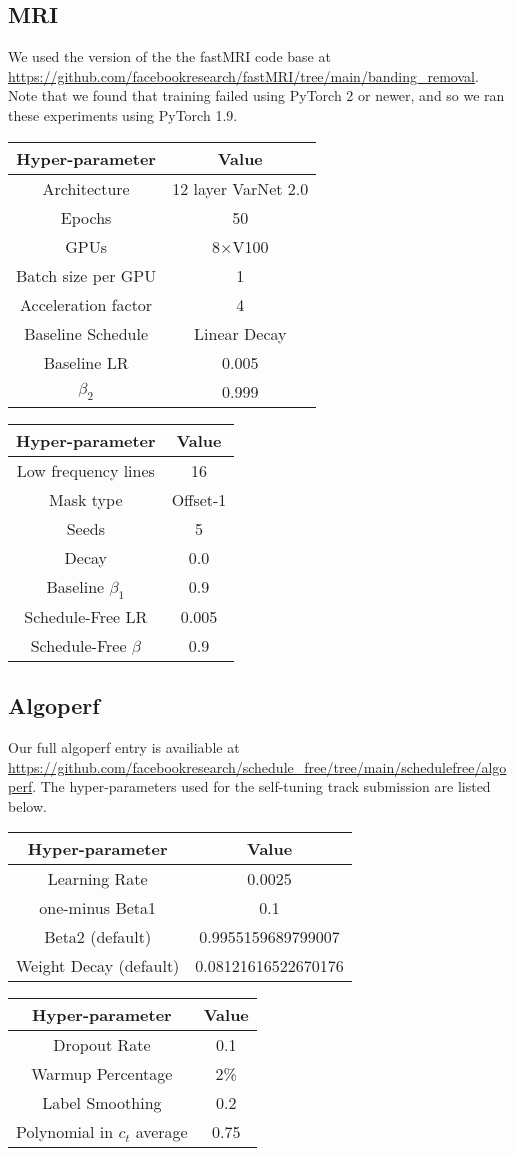 \documentclass{article}
\begin{document}
\subsection{MRI}
We used the version of the the fastMRI code base at \url{https://github.com/facebookresearch/fastMRI/tree/main/banding_removal}. Note that we found that training failed using PyTorch 2 or newer, and so we ran these experiments using PyTorch 1.9.

\begin{tabular}[t]{|c|c|}
\hline 
\textbf{Hyper-parameter}  & \textbf{Value}\tabularnewline
\hline
Architecture  & 12 layer VarNet 2.0\tabularnewline
\hline 
Epochs  & 50\tabularnewline
\hline 
GPUs  & 8$\times $V100\tabularnewline
\hline 
Batch size per GPU  & 1\tabularnewline
\hline 
Acceleration factor  & 4\tabularnewline
\hline
Baseline Schedule & Linear Decay\tabularnewline
\hline
Baseline LR & 0.005 \tabularnewline
\hline 
$\beta_2$ & 0.999 \tabularnewline
\hline 
\end{tabular}
\quad
\begin{tabular}[t]{|c|c|}
\hline 
\textbf{Hyper-parameter} & \textbf{Value}\tabularnewline
\hline 
Low frequency lines  & 16\tabularnewline
\hline 
Mask type  & Offset-1\tabularnewline
\hline 
Seeds & 5\tabularnewline
\hline 
Decay & 0.0\tabularnewline
\hline 
Baseline $\beta_1$ & 0.9 \tabularnewline
\hline 
Schedule-Free LR & 0.005 \tabularnewline
\hline
Schedule-Free $\beta$ & 0.9 \tabularnewline
\hline
\end{tabular}

\subsection{Algoperf}
Our full algoperf entry is availiable at \url{https://github.com/facebookresearch/schedule_free/tree/main/schedulefree/algoperf}. The hyper-parameters used for the self-tuning track submission are listed below.

\begin{tabular}[t]{|c|c|}
\hline 
\textbf{Hyper-parameter}  & \textbf{Value}\tabularnewline
\hline 
Learning Rate  & 0.0025\tabularnewline
\hline 
one-minus Beta1  & 0.1\tabularnewline
\hline 
Beta2 (default)  & 0.9955159689799007 \tabularnewline
\hline 
Weight Decay (default) & 0.08121616522670176\tabularnewline
\hline 
\end{tabular}
\quad
\begin{tabular}[t]{|c|c|}
\hline 
\textbf{Hyper-parameter} & \textbf{Value}\tabularnewline
\hline
Dropout Rate  & 0.1\tabularnewline
\hline 
Warmup Percentage  & 2\%\tabularnewline
\hline 
Label Smoothing  & 0.2  \tabularnewline
\hline 
Polynomial in $c_t$ average & 0.75 \tabularnewline
\hline
\end{tabular}
\end{document}
